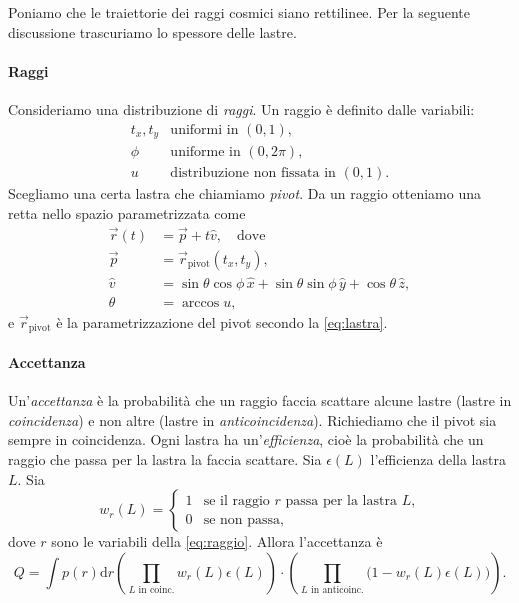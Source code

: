 Poniamo che le traiettorie dei raggi cosmici siano rettilinee.
Per la seguente discussione trascuriamo lo spessore delle lastre.

\paragraph{Raggi}

Consideriamo una distribuzione di \emph{raggi}.
Un raggio è definito dalle variabili:
\begin{equation}
	\label{eq:raggio}
	\begin{array}{ll}
		t_x, t_y & \text{uniformi in $(0,1)$}, \\
		\phi     & \text{uniforme in $(0,2\pi)$}, \\
		u        & \text{distribuzione non fissata in $(0,1)$}.
	\end{array}
\end{equation}
Scegliamo una certa lastra che chiamiamo \emph{pivot}.
Da un raggio otteniamo una retta nello spazio parametrizzata come
\begin{align*}
	\vec r(t) &= \vec p + t \hat v, \quad \text{dove} \\
	\vec p    &= \vec r_\text{pivot}(t_x, t_y), \\
	\hat v    &= \sin\theta\cos\phi\,\hat x + \sin\theta\sin\phi\,\hat y + \cos\theta\,\hat z, \\
	\theta    &= \arccos u,
\end{align*}
e $\vec r_\text{pivot}$ è la parametrizzazione del pivot secondo la \eqref{eq:lastra}.

\paragraph{Accettanza}

Un'\emph{accettanza} è la probabilità che un raggio
faccia scattare alcune lastre (lastre in \emph{coincidenza})
e non altre (lastre in \emph{anticoincidenza}).
Richiediamo che il pivot sia sempre in coincidenza.
Ogni lastra ha un'\emph{efficienza},
cioè la probabilità che un raggio che passa per la lastra la faccia scattare.
Sia $\epsilon(L)$ l'efficienza della lastra $L$.
Sia
\begin{equation*}
	w_r(L) = \begin{cases}
		1 & \text{se il raggio $r$ passa per la lastra $L$,} \\
		0 & \text{se non passa,}
	\end{cases}
\end{equation*}
dove $r$ sono le variabili della \eqref{eq:raggio}.
Allora l'accettanza è
\begin{equation}
	\label{eq:acc}
	Q = \int p(r) \mathrm{d} r
	\left( \prod_\text{$L$ in coinc.} w_r(L) \epsilon(L) \right)
	\cdot \left( \prod_\text{$L$ in anticoinc.} \big(1 - w_r(L) \epsilon(L)\big) \right).
\end{equation}


